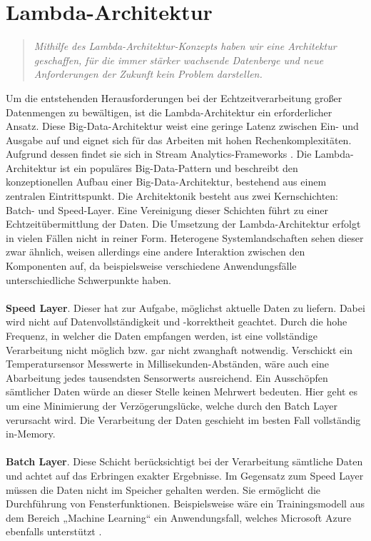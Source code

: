 \section{Lambda-Architektur}

\begin{quote} \textit{\glqq Mithilfe des Lambda-Architektur-Konzepts haben wir eine Architektur geschaffen, für die immer stärker wachsende Datenberge und neue Anforderungen der Zukunft kein Problem darstellen. \grqq~}\cite[S.2]{opitz.2017} \\ \end{quote} 
Um die entstehenden Herausforderungen bei der Echtzeitverarbeitung großer Datenmengen zu bewältigen, ist die Lambda-Architektur ein erforderlicher Ansatz. Diese Big-Data-Architektur weist eine geringe Latenz zwischen Ein- und Ausgabe auf und eignet sich für das Arbeiten mit hohen Rechenkomplexitäten. Aufgrund dessen findet sie sich in Stream Analytics-Frameworks \cite{Familiar.2017}. Die Lambda-Architektur ist ein populäres Big-Data-Pattern und beschreibt den konzeptionellen Aufbau einer Big-Data-Architektur, bestehend aus einem zentralen Eintrittspunkt. Die Architektonik besteht aus zwei Kernschichten: Batch- und Speed-Layer. Eine Vereinigung dieser Schichten führt zu einer Echtzeitübermittlung der Daten. Die Umsetzung der Lambda-Architektur erfolgt in vielen Fällen nicht in reiner Form. Heterogene Systemlandschaften sehen dieser zwar ähnlich, weisen allerdings eine andere Interaktion zwischen den Komponenten auf, da beispielsweise verschiedene Anwendungsfälle unterschiedliche Schwerpunkte haben.  \\ \\ \textbf{Speed Layer}. Dieser hat zur Aufgabe, möglichst aktuelle Daten zu liefern. Dabei wird nicht auf Datenvollständigkeit und -korrektheit geachtet. Durch die hohe Frequenz, in welcher die Daten empfangen werden, ist eine vollständige Verarbeitung nicht möglich bzw. gar nicht zwanghaft notwendig. Verschickt ein Temperatursensor Messwerte in Millisekunden-Abständen, wäre auch eine Abarbeitung jedes tausendsten Sensorwerts ausreichend. Ein Ausschöpfen sämtlicher Daten würde an dieser Stelle keinen Mehrwert bedeuten. Hier geht es um eine Minimierung der Verzögerungslücke, welche durch den Batch Layer verursacht wird. Die Verarbeitung der Daten geschieht im besten Fall vollständig in-Memory.\\ \\ \textbf{Batch Layer}. 
Diese Schicht berücksichtigt bei der Verarbeitung sämtliche Daten und achtet auf das Erbringen exakter Ergebnisse. Im Gegensatz zum Speed Layer müssen die Daten nicht im Speicher gehalten werden. Sie ermöglicht die Durchführung von Fensterfunktionen. Beispielsweise wäre ein Trainingsmodell aus dem Bereich „Machine Learning“ ein Anwendungsfall, welches Microsoft Azure ebenfalls unterstützt \cite{Berle.2017}. 

